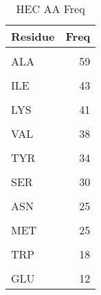 	
	\begin{table}
		\caption{HEC AA Freq}
		\label{tbl:HEC_aaFreq}
		\centering
		\begin{tabular}{lr}
			\toprule
			Residue & Freq\\
			\midrule
			\cellcolor{gray!6}{LEU} & \cellcolor{gray!6}{71}\\
			ALA & 59\\
			\cellcolor{gray!6}{GLY} & \cellcolor{gray!6}{49}\\
			ILE & 43\\
			\cellcolor{gray!6}{PHE} & \cellcolor{gray!6}{42}\\
			\addlinespace
			LYS & 41\\
			\cellcolor{gray!6}{THR} & \cellcolor{gray!6}{40}\\
			VAL & 38\\
			\cellcolor{gray!6}{PRO} & \cellcolor{gray!6}{34}\\
			TYR & 34\\
			\addlinespace
			\cellcolor{gray!6}{ARG} & \cellcolor{gray!6}{31}\\
			SER & 30\\
			\cellcolor{gray!6}{CYS} & \cellcolor{gray!6}{28}\\
			ASN & 25\\
			\cellcolor{gray!6}{HIS} & \cellcolor{gray!6}{25}\\
			\addlinespace
			MET & 25\\
			\cellcolor{gray!6}{GLN} & \cellcolor{gray!6}{18}\\
			TRP & 18\\
			\cellcolor{gray!6}{ASP} & \cellcolor{gray!6}{17}\\
			GLU & 12\\
			\bottomrule
		\end{tabular}
	\end{table}

